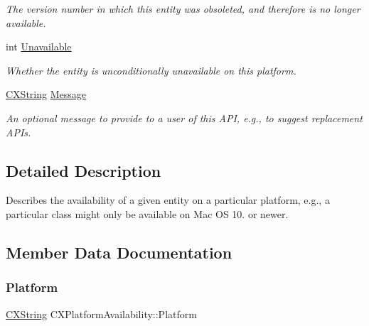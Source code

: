 \begin{DoxyCompactItemize}
\begin{DoxyCompactList}\small\item\em The version number in which this entity was obsoleted, and therefore is no longer available. \end{DoxyCompactList}\item 
\mbox{\label{structCXPlatformAvailability_aab40800840259fe995c03fbd1560b6d8}} 
int \mbox{\hyperlink{structCXPlatformAvailability_aab40800840259fe995c03fbd1560b6d8}{Unavailable}}
\begin{DoxyCompactList}\small\item\em Whether the entity is unconditionally unavailable on this platform. \end{DoxyCompactList}\item 
\mbox{\label{structCXPlatformAvailability_a73de247ef29d6384a44742d45d02b915}} 
\mbox{\hyperlink{structCXString}{C\+X\+String}} \mbox{\hyperlink{structCXPlatformAvailability_a73de247ef29d6384a44742d45d02b915}{Message}}
\begin{DoxyCompactList}\small\item\em An optional message to provide to a user of this A\+PI, e.\+g., to suggest replacement A\+P\+Is. \end{DoxyCompactList}\end{DoxyCompactItemize}


\subsection{Detailed Description}
Describes the availability of a given entity on a particular platform, e.\+g., a particular class might only be available on Mac OS 10. or newer. 

\subsection{Member Data Documentation}
\mbox{\label{structCXPlatformAvailability_a4ae9c3ed26d1701f0cd42d6743f3e901}} 
\subsubsection{\texorpdfstring{Platform}{Platform}}
{\footnotesize\ttfamily \mbox{\hyperlink{structCXString}{C\+X\+String}} C\+X\+Platform\+Availability\+::\+Platform}



